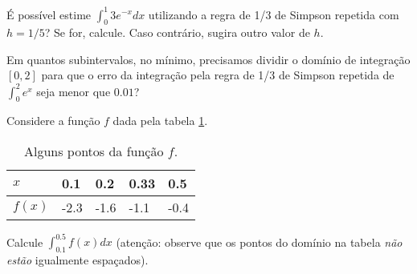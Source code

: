 \begin{ex}
É possível estime $\int_0^1 3e^{-x}dx$ utilizando a regra de 1/3 de Simpson repetida com $h=1/5$? Se for, calcule. Caso contrário, sugira outro valor de $h$.
\end{ex}


\begin{ex}
Em quantos subintervalos, no mínimo, precisamos dividir o domínio de integração $[0,2]$ para que o erro da integração pela regra de 1/3 de Simpson repetida de $\int_0^{2}e^x$ seja menor que $0.01$?
\end{ex}

\begin{ex}
Considere a função $f$ dada pela tabela \ref{diferente}.

\begin{table}[htb]
\centering
\caption{Alguns pontos da função $f$.}
\label{diferente}
\begin{tabular}{@{}lllll@{}}
\toprule
$x$    & 0.1    & 0.2    	& 0.33    & 0.5    \\ \midrule
$f(x)$ & -2.3 	& -1.6		& -1.1 & -0.4  \\ \bottomrule
\end{tabular}
\end{table}
\end{ex}
Calcule $\int_{0.1}^{0.5}f(x)dx$ (atenção: observe que os pontos do domínio na tabela \emph{não estão} igualmente espaçados).
%
%